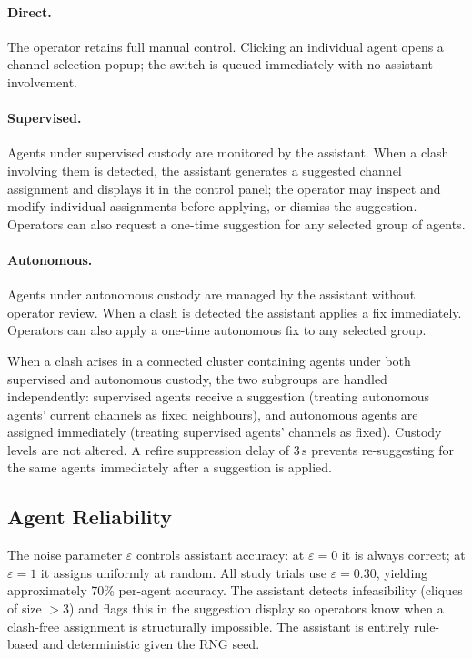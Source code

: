 \documentclass[10pt]{article}
\theoremstyle{definition}
\begin{document}
\paragraph{Direct.}
The operator retains full manual control. Clicking an individual agent opens a channel-selection popup; the switch is queued immediately with no assistant involvement.

\paragraph{Supervised.}
Agents under supervised custody are monitored by the assistant. When a clash involving them is detected, the assistant generates a suggested channel assignment and displays it in the control panel; the operator may inspect and modify individual assignments before applying, or dismiss the suggestion. Operators can also request a one-time suggestion for any selected group of agents.

\paragraph{Autonomous.}
Agents under autonomous custody are managed by the assistant without operator review. When a clash is detected the assistant applies a fix immediately. Operators can also apply a one-time autonomous fix to any selected group.

When a clash arises in a connected cluster containing agents under both supervised and autonomous custody, the two subgroups are handled independently: supervised agents receive a suggestion (treating autonomous agents' current channels as fixed neighbours), and autonomous agents are assigned immediately (treating supervised agents' channels as fixed). Custody levels are not altered. A refire suppression delay of $3\,\mathrm{s}$ prevents re-suggesting for the same agents immediately after a suggestion is applied.

\subsection{Agent Reliability}
The noise parameter $\varepsilon$ controls assistant accuracy: at $\varepsilon = 0$ it is always correct; at $\varepsilon = 1$ it assigns uniformly at random. All study trials use $\varepsilon = 0.30$, yielding approximately 70\% per-agent accuracy. The assistant detects infeasibility (cliques of size $> 3$) and flags this in the suggestion display so operators know when a clash-free assignment is structurally impossible. The assistant is entirely rule-based and deterministic given the RNG seed.
\end{document}
